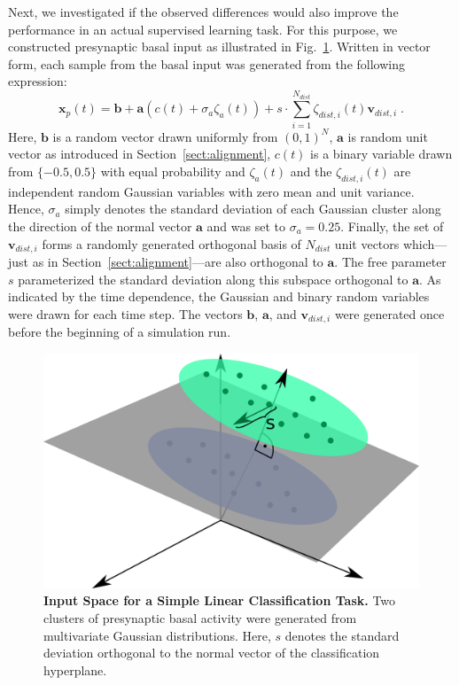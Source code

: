 \documentclass[10pt,a4paper,twocolumn]{article}
\begin{document}
		Next, we investigated if the observed differences would also improve
		the performance in an actual supervised learning task.
		For this purpose, we constructed presynaptic basal input as illustrated
		in Fig.~\ref{fig:illustration_classification}.
		Written in vector form,
		each sample from the basal input was generated from the following expression:
		\begin{equation}
			\mathbf{x}_p(t) = \mathbf{b} + \mathbf{a}\left(c(t) + \sigma_a \zeta_a(t) \right) 
			+ s \cdot \sum_{i=1}^{N_{dist}} \zeta_{dist,i}(t) \mathbf{v}_{dist,i} \; .
		\end{equation}
		Here, $\mathbf{b}$ is a random vector drawn uniformly from
		$(0,1)^N$, $\mathbf{a}$ is random unit vector as introduced in 
		Section~\ref{sect:alignment}, $c(t)$ is a binary variable drawn 
		from $\{-0.5,0.5\}$ with equal probability and $\zeta_a(t)$ and the
		$\zeta_{dist,i}(t)$ are independent random Gaussian variables with 
		zero mean and unit variance. 
		Hence, $\sigma_a$ simply denotes the standard deviation of each Gaussian
		cluster along the direction of the normal vector $\mathbf{a}$ and was
		set to $\sigma_a = 0.25$. 
		Finally, the set of $\mathbf{v}_{dist,i}$ forms a randomly generated
		orthogonal basis of $N_{dist}$ unit vectors which---just as in 
		Section~\ref{sect:alignment}---are also orthogonal to $\mathbf{a}$.
		The free parameter $s$ parameterized
		the standard deviation along this subspace orthogonal to $\mathbf{a}$.
		As indicated by the time dependence, the Gaussian and binary random
		variables were drawn for each time step. The vectors
		$\mathbf{b}$, $\mathbf{a}$, and $\mathbf{v}_{dist,i}$ were generated
		once before the beginning of a simulation run.
		\begin{figure}
			\centering
			\includegraphics[width=0.75\columnwidth]{illustration_classification}
			\caption{{\bf Input Space for a Simple Linear Classification Task.}
				Two clusters of presynaptic basal activity were generated from 
				multivariate Gaussian distributions. Here, $s$ denotes the standard
				deviation orthogonal to the normal vector of the classification
				hyperplane.}
			\label{fig:illustration_classification}
		\end{figure}
		
\end{document}
